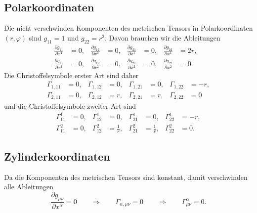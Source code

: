 \subsection{Polarkoordinaten}
Die nicht verschwinden Komponenten
des metrischen Tensors in Polarkoordinaten $(r,\varphi)$
sind $g_{11}=1$ und $g_{22}=r^2$.
Davon brauchen wir die Ableitungen
\[
\begin{aligned}
\frac{\partial g_{11}}{\partial x^1} &=0,&
\frac{\partial g_{12}}{\partial x^1} &=0,&
\frac{\partial g_{21}}{\partial x^1} &=0,&
\frac{\partial g_{22}}{\partial x^1} &=2r,&
\\
\frac{\partial g_{11}}{\partial x^2} &=0,&
\frac{\partial g_{12}}{\partial x^2} &=0,&
\frac{\partial g_{21}}{\partial x^2} &=0,&
\frac{\partial g_{22}}{\partial x^2} &=0
\end{aligned}
\]
Die Christoffelsymbole erster Art sind daher 
\[
\begin{aligned}
\Gamma_{1,11} &=  0,&
\Gamma_{1,12} &=  0,&
\Gamma_{1,21} &=  0,&
\Gamma_{1,22} &= -r,
\\
\Gamma_{2,11} &=  0,&
\Gamma_{2,12} &=  r,&
\Gamma_{2,21} &=  r,&
\Gamma_{2,22} &=  0
\end{aligned}
\]
und die Christoffelsymbole zweiter Art sind
\begin{equation}
\begin{aligned}
\Gamma_{11}^1 &= 0,&
\Gamma_{12}^1 &= 0,&
\Gamma_{21}^1 &= 0,&
\Gamma_{22}^1 &=-r,
\\
\Gamma_{11}^2 &= 0,&
\Gamma_{12}^2 &= \frac1{r},&
\Gamma_{21}^2 &= \frac1{r},&
\Gamma_{22}^2 &= 0.
\end{aligned}
\label{skript:geodaeten:christoffel:polar}
\end{equation}

\subsection{Zylinderkoordinaten}
Da die Komponenten des metrischen Tensors sind konstant, damit verschwinden
alle Ableitungen
\[
\frac{\partial g_{\mu\nu}}{\partial x^\alpha}=0
\qquad\Rightarrow\qquad
\Gamma_{\alpha,\mu\nu}=0
\qquad\Rightarrow\qquad
\Gamma_{\mu\nu}^\alpha=0.
\]

